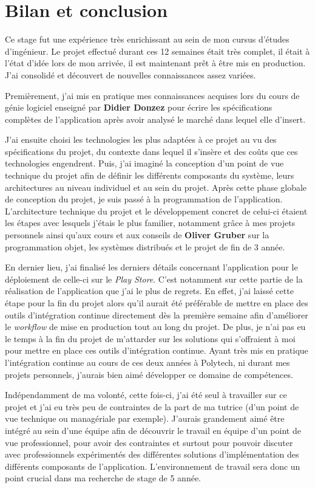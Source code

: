 \chapter{Bilan et conclusion}
\label{chapter:bilan}

Ce stage fut une expérience très enrichissant au sein de mon cursus d'études d'ingénieur. Le projet effectué durant ces 12 semaines était très complet, il était à l'état d'idée lors de mon arrivée, il est maintenant prêt à être mis en production. J'ai consolidé et découvert de nouvelles connaissances assez variées.

Premièrement, j'ai mis en pratique mes connaissances acquises lors du cours de génie logiciel enseigné par \textbf{Didier Donzez} pour écrire les spécifications complètes de l'application après avoir analysé le marché dans lequel elle d'insert.

J'ai ensuite choisi les technologies les plus adaptées à ce projet au vu des spécifications du projet, du contexte dans lequel il s'insère et des coûts que ces technologies engendrent. Puis, j'ai imaginé la conception d'un point de vue technique du projet afin de définir les différents composants du système, leurs architectures au niveau individuel et au sein du projet. Après cette phase globale de conception du projet, je suis passé à la programmation de l'application. L'architecture technique du projet et le développement concret de celui-ci étaient les étapes avec lesquels j'étais le plus familier, notamment grâce à mes projets personnels ainsi qu'aux cours et aux conseils de \textbf{Oliver Gruber} sur la programmation objet, les systèmes distribués et le projet de fin de 3 année.

En dernier lieu, j'ai finalisé les derniers détails concernant l'application pour le déploiement de celle-ci sur le \textit{Play Store}. C'est notamment sur cette partie de la réalisation de l'application que j'ai le plus de regrets. En effet, j'ai laissé cette étape pour la fin du projet alors qu'il aurait été préférable de mettre en place des outils d'intégration continue directement dès la première semaine afin d'améliorer le \textit{workflow} de mise en production tout au long du projet. De plus, je n'ai pas eu le temps à la fin du projet de m'attarder sur les solutions qui s'offraient à moi pour mettre en place ces outils d'intégration continue. Ayant très mis en pratique l'intégration continue au cours de ces deux années à Polytech, ni durant mes projets personnels, j'aurais bien aimé développer ce domaine de compétences.

Indépendamment de ma volonté, cette fois-ci, j'ai été seul à travailler sur ce projet et j'ai eu très peu de contraintes de la part de ma tutrice (d'un point de vue technique ou managériale par exemple). J'aurais grandement aimé être intégré au sein d'une équipe afin de découvrir le travail en équipe d'un point de vue professionnel, pour avoir des contraintes et surtout pour pouvoir discuter avec professionnels expérimentés des différentes solutions d'implémentation des différents composants de l'application. L'environnement de travail sera donc un point crucial dans ma recherche de stage de 5 année.
